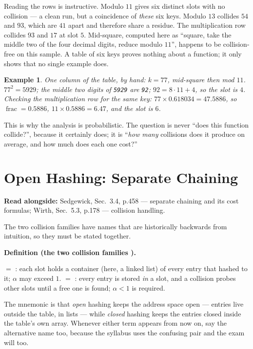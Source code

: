 \documentclass[11pt]{article}
\newtheorem{example}{Example}[section]
\newenvironment{definitionbox}[1]{%
  \par\noindent\textbf{Definition (#1).}\ \itshape
}{\par\vspace{0.3em}}
\begin{document}
Reading the rows is instructive. Modulo $11$ gives six distinct slots with no collision --- a clean run, but a coincidence of \emph{these} six keys. Modulo $13$ collides $54$ and $93$, which are $41$ apart and therefore share a residue. The multiplication row collides $93$ and $17$ at slot $5$. Mid-square, computed here as ``square, take the middle two of the four decimal digits, reduce modulo $11$'', happens to be collision-free on this sample. A table of six keys proves nothing about a function; it only shows that no single example does.

\begin{example}
\emph{One column of the table, by hand: $k = 77$, mid-square then mod $11$.} $77^2 = 5929$; the middle two digits of \texttt{5929} are \texttt{92}; $92 = 8\cdot11 + 4$, so the slot is $4$. Checking the multiplication row for the same key: $77 \times 0.618034 = 47.5886$, so $\operatorname{frac} = 0.5886$, $11 \times 0.5886 = 6.47$, and the slot is $6$.
\end{example}

This is why the analysis is probabilistic. The question is never ``does this function collide?'', because it certainly does; it is ``\emph{how many} collisions does it produce on average, and how much does each one cost?''

\section{Open Hashing: Separate Chaining}

\textbf{Read alongside:} Sedgewick, Sec.~3.4, p.458 --- separate chaining and its cost formulas; Wirth, Sec.~5.3, p.178 --- collision handling.

The two collision families have names that are historically backwards from intuition, so they must be stated together.

\begin{definitionbox}{the two collision families \cite{Sedgewick2011_algorithms,Wirth2004_algorithms_data_structures}}
 $=$ : each slot holds a container (here, a linked list) of every entry that hashed to it; $\alpha$ may exceed $1$.
 $=$ : every entry is stored \emph{in} a slot, and a collision probes other slots until a free one is found; $\alpha < 1$ is required.
\end{definitionbox}

The mnemonic is that \emph{open} hashing keeps the address space open --- entries live outside the table, in lists --- while \emph{closed} hashing keeps the entries closed inside the table's own array. Whenever either term appears from now on, say the alternative name too, because the syllabus uses the confusing pair and the exam will too.
\end{document}
